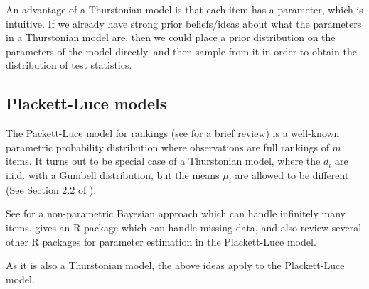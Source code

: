 \documentclass[10pt]{article}
\begin{document}
An advantage of a Thurstonian model is that each item has a parameter, which is intuitive. If we already have strong prior beliefs/ideas about what the parameters in a Thurstonian model are, then we could place a prior distribution on the parameters of the model directly, and then sample from it in order to obtain the distribution of test statistics.


\subsection{Plackett-Luce models}
\label{sec:pl}
The Packett-Luce model for rankings (see \cite{maystre2015fast} for a brief review) is a well-known parametric probability distribution where observations are full rankings of $m$ items. It turns out to be special case of a Thurstonian model, where the $d_i$ are i.i.d. with a Gumbell distribution, but the means $\mu_i$ are allowed to be different (See Section 2.2 of \cite{guiver2009bayesian}).

See \cite{caron2014bayesian} for a non-parametric Bayesian approach which can handle infinitely many items. \cite{turner2020modelling} gives an R package which can handle missing data, and also review several other R packages for parameter estimation in the Plackett-Luce model.

As it is also a Thurstonian model, the above ideas apply to the Plackett-Luce model.

\appendix

    
\end{document}
